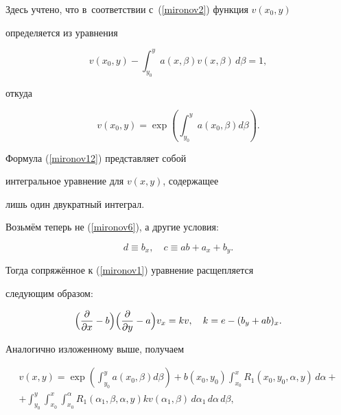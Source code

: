 Здесь учтено, что в~соответствии с~(\ref{mironov2}) функция $v(x_0,y)$


определяется из уравнения


$$


v(x_0,y)-\int_{y_0}^{y} a(x,\beta)v(x,\beta)\,d\beta=1,


$$


откуда


$$


v(x_0,y)=\exp\left( \int_{y_{0}}^{y} a(x_{0}, \beta)d\beta\right).


$$





Формула (\ref{mironov12}) представляет собой


интегральное уравнение для $v(x,y)$, содержащее


лишь один двукратный интеграл.





Возьмём теперь не (\ref{mironov6}), а другие условия:


\begin{equation}\label{mironov13}


d\equiv b_{x},\quad c\equiv ab+a_{x}+b_{y}.


\end{equation}


Тогда сопряжённое к (\ref{mironov1}) уравнение расщепляется


следующим образом:


\begin{equation}\label{mironov14}


\Bigl ( \frac{\partial}{\partial x}-b \Bigr )


\Bigl ( \frac{\partial}{\partial y}-a \Bigr )v_{x} = kv,


\quad k=e-(b_{y}+ab)_{x}.


\end{equation}


Аналогично изложенному выше, получаем


\begin{multline}\label{mironov15}


v(x,y)=\exp\left( \int_{y_{0}}^{y} a(x_{0}, \beta)d\beta\right)


+b(x_{0}, y_{0})\int_{x_{0}}^{x} R_{1}(x_{0}, y_{0}, \alpha,y)\,d\alpha+\\


+\int_{y_{0}}^{y}\int_{x_{0}}^{x}\int_{x_{0}}^{\alpha} R_{1}(\alpha_{1},\beta,\alpha,y) kv(\alpha_{1},\beta)


\,d\alpha_{1} \,d\alpha \,d\beta ,


\end{multline}


